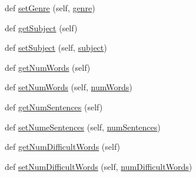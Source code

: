 \begin{DoxyCompactItemize}
\item 
def \hyperlink{class_gutenberg_book_1_1_gutenberg_book_a9fb7a7667deda6077c7442a6437a0783}{set\+Genre} (self, \hyperlink{class_gutenberg_book_1_1_gutenberg_book_ab26f43198c585ea7b4b1413250e75d78}{genre})
\item 
def \hyperlink{class_gutenberg_book_1_1_gutenberg_book_a32d638f7891d61aae4fabd2e1940d8a2}{get\+Subject} (self)
\item 
def \hyperlink{class_gutenberg_book_1_1_gutenberg_book_a110d79b5d2f57700935f95609b7192cf}{set\+Subject} (self, \hyperlink{class_gutenberg_book_1_1_gutenberg_book_ae8cefa9cabbbbe09e919b9c0e8f6577e}{subject})
\item 
def \hyperlink{class_gutenberg_book_1_1_gutenberg_book_af3311d3f4c1a2f16fd13a91b2a64ef44}{get\+Num\+Words} (self)
\item 
def \hyperlink{class_gutenberg_book_1_1_gutenberg_book_a02e3c8a8c2219d9120a86cea7b7902a4}{set\+Num\+Words} (self, \hyperlink{class_gutenberg_book_1_1_gutenberg_book_a03bded71365c803889b37370001bc679}{num\+Words})
\item 
def \hyperlink{class_gutenberg_book_1_1_gutenberg_book_a778b3437a11a6884c505b71ead63a074}{get\+Num\+Sentences} (self)
\item 
def \hyperlink{class_gutenberg_book_1_1_gutenberg_book_a1b335a4ce7484b547b7acf5a8c86e591}{set\+Nume\+Sentences} (self, \hyperlink{class_gutenberg_book_1_1_gutenberg_book_ae2b9fe952d14c8193d95f5ed2a51e679}{num\+Sentences})
\item 
def \hyperlink{class_gutenberg_book_1_1_gutenberg_book_a2a9cd21224d17e5da28889751529c31c}{get\+Num\+Difficult\+Words} (self)
\item 
def \hyperlink{class_gutenberg_book_1_1_gutenberg_book_a9c0c61e2580f8008656dafa8811be96d}{set\+Num\+Difficult\+Words} (self, \hyperlink{class_gutenberg_book_1_1_gutenberg_book_a702230ada41f3fbf9daa27234893c8d7}{num\+Difficult\+Words})
\end{DoxyCompactItemize}

